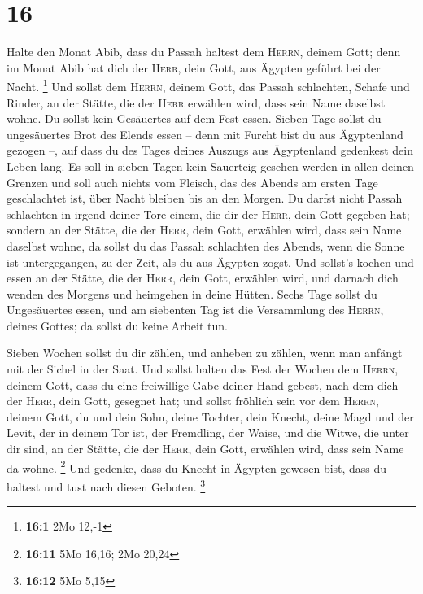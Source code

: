 \hypertarget{section-1}{%
\section{16}\label{section-1}}

 Halte den Monat Abib, dass du Passah haltest dem
\textsc{Herrn}, deinem Gott; denn im Monat Abib hat dich der
\textsc{Herr}, dein Gott, aus Ägypten geführt bei der Nacht. \footnote{\textbf{16:1}
  2Mo 12,-1}  Und sollst dem \textsc{Herrn}, deinem Gott,
das Passah schlachten, Schafe und Rinder, an der Stätte, die der
\textsc{Herr} erwählen wird, dass sein Name daselbst wohne.
 Du sollst kein Gesäuertes auf dem Fest essen. Sieben Tage
sollst du ungesäuertes Brot des Elends essen -- denn mit Furcht bist du
aus Ägyptenland gezogen --, auf dass du des Tages deines Auszugs aus
Ägyptenland gedenkest dein Leben lang.  Es soll in sieben
Tagen kein Sauerteig gesehen werden in allen deinen Grenzen und soll
auch nichts vom Fleisch, das des Abends am ersten Tage geschlachtet ist,
über Nacht bleiben bis an den Morgen.  Du darfst nicht
Passah schlachten in irgend deiner Tore einem, die dir der
\textsc{Herr}, dein Gott gegeben hat;  sondern an der
Stätte, die der \textsc{Herr}, dein Gott, erwählen wird, dass sein Name
daselbst wohne, da sollst du das Passah schlachten des Abends, wenn die
Sonne ist untergegangen, zu der Zeit, als du aus Ägypten zogst.
 Und sollst's kochen und essen an der Stätte, die der
\textsc{Herr}, dein Gott, erwählen wird, und darnach dich wenden des
Morgens und heimgehen in deine Hütten.  Sechs Tage sollst
du Ungesäuertes essen, und am siebenten Tag ist die Versammlung des
\textsc{Herrn}, deines Gottes; da sollst du keine Arbeit tun.

 Sieben Wochen sollst du dir zählen, und anheben zu
zählen, wenn man anfängt mit der Sichel in der Saat.  Und
sollst halten das Fest der Wochen dem \textsc{Herrn}, deinem Gott, dass
du eine freiwillige Gabe deiner Hand gebest, nach dem dich der
\textsc{Herr}, dein Gott, gesegnet hat;  und sollst
fröhlich sein vor dem \textsc{Herrn}, deinem Gott, du und dein Sohn,
deine Tochter, dein Knecht, deine Magd und der Levit, der in deinem Tor
ist, der Fremdling, der Waise, und die Witwe, die unter dir sind, an der
Stätte, die der \textsc{Herr}, dein Gott, erwählen wird, dass sein Name
da wohne. \footnote{\textbf{16:11} 5Mo 16,16; 2Mo 20,24} 
Und gedenke, dass du Knecht in Ägypten gewesen bist, dass du haltest und
tust nach diesen Geboten. \footnote{\textbf{16:12} 5Mo 5,15}

